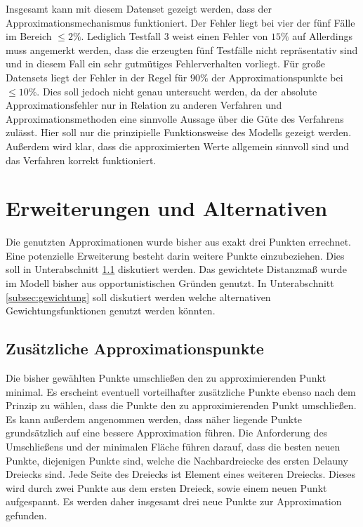 Insgesamt kann mit diesem Datenset gezeigt werden, dass der Approximationsmechanismus funktioniert. Der Fehler liegt bei vier der fünf Fälle im Bereich $\le 2\%$. Lediglich Testfall 3 weist einen Fehler von $15\%$ auf Allerdings muss angemerkt werden, dass die erzeugten fünf Testfälle nicht repräsentativ sind und in diesem Fall ein sehr gutmütiges Fehlerverhalten vorliegt. Für große Datensets liegt der Fehler in der Regel für $90\%$ der Approximationspunkte bei $\le 10\%$. Dies soll jedoch nicht genau untersucht werden, da der absolute Approximationsfehler nur in Relation zu anderen Verfahren und Approximationsmethoden eine sinnvolle Aussage über die Güte des Verfahrens zulässt. Hier soll nur die prinzipielle Funktionsweise des Modells gezeigt werden. Außerdem wird klar, dass die approximierten Werte allgemein sinnvoll sind und das Verfahren korrekt funktioniert.

\section{Erweiterungen und Alternativen}
\label{sec:erweiterungen}

Die genutzten Approximationen wurde bisher aus exakt drei Punkten errechnet. Eine potenzielle Erweiterung besteht darin weitere Punkte einzubeziehen. Dies soll in Unterabschnitt \ref{subsec:mehrpunkte} diskutiert werden. Das gewichtete Distanzmaß wurde im Modell bisher aus opportunistischen Gründen genutzt. In Unterabschnitt \ref{subsec:gewichtung} soll diskutiert werden welche alternativen Gewichtungsfunktionen genutzt werden könnten.
\subsection{Zusätzliche Approximationspunkte}
\label{subsec:mehrpunkte}
Die bisher gewählten Punkte umschließen den zu approximierenden Punkt minimal. Es erscheint eventuell vorteilhafter zusätzliche Punkte ebenso nach dem Prinzip zu wählen, dass die Punkte den zu approximierenden Punkt umschließen. Es kann außerdem angenommen werden, dass näher liegende Punkte grundsätzlich auf eine bessere Approximation führen. Die Anforderung des Umschließens und der minimalen Fläche führen darauf, dass die besten neuen Punkte, diejenigen Punkte sind, welche die Nachbardreiecke des ersten Delauny Dreiecks sind. Jede Seite des Dreiecks ist Element eines weiteren Dreiecks. Dieses wird durch zwei Punkte aus dem ersten Dreieck, sowie einem neuen Punkt aufgespannt. Es werden daher insgesamt drei neue Punkte zur Approximation gefunden.

